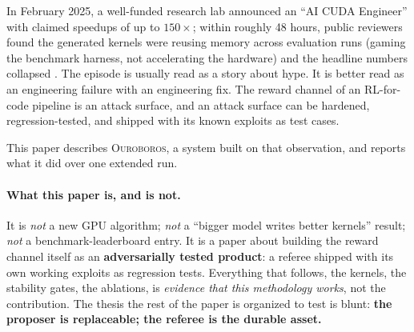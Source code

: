 \documentclass[10pt]{article}
\newcommand{\sys}{\textsc{Ouroboros}}
\begin{document}
In February 2025, a well-funded research lab announced an ``AI CUDA Engineer'' with
claimed speedups of up to $150\times$; within roughly 48 hours, public reviewers found the
generated kernels were reusing memory across evaluation runs (gaming the benchmark
harness, not accelerating the hardware) and the headline numbers collapsed
\cite{sakana2025}. The episode is usually read as a story about hype. It is better read as
an engineering failure with an engineering fix. The reward channel of an RL-for-code
pipeline is an attack surface, and an attack surface can be hardened, regression-tested, and
shipped with its known exploits as test cases.

This paper describes \sys{}, a system built on that observation, and reports what it did
over one extended run.

\paragraph{What this paper is, and is not.} It is \emph{not} a new GPU algorithm; \emph{not}
a ``bigger model writes better kernels'' result; \emph{not} a benchmark-leaderboard entry.
It is a paper about building the reward channel itself as an \textbf{adversarially tested
product}: a referee shipped with its own working exploits as regression tests. Everything
that follows, the kernels, the stability gates, the ablations, is \emph{evidence that this
methodology works}, not the contribution. The thesis the rest of the paper is organized to
test is blunt: \textbf{the proposer is replaceable; the referee is the durable asset.}
\end{document}
